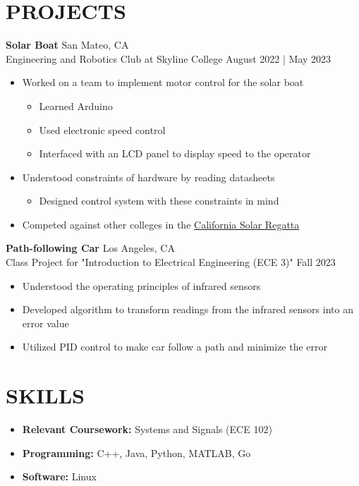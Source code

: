 \documentclass[letterpaper,9pt]{extarticle}
\begin{document}
\section*{PROJECTS}
\noindent
\textbf{Solar Boat} \hfill San Mateo, CA\\ %
Engineering and Robotics Club at Skyline College \hfill August 2022 | May 2023 %
\begin{itemize}
	\item Worked on a team to implement motor control for the solar boat
	\begin{itemize}
		\item Learned Arduino
		\item Used electronic speed control
		\item Interfaced with an LCD panel to display speed to the operator
	\end{itemize}
	\item Understood constraints of hardware by reading datasheets
	\begin{itemize}
		\item Designed control system with these constraints in mind
	\end{itemize}
	\item Competed against other colleges in the \href{https://www.smud.org/en/In-Our-Community/Workshops-and-education-resources/Teachers-and-students/Solar-Regatta}{California Solar Regatta}
\end{itemize}

\noindent
\textbf{Path-following Car} \hfill Los Angeles, CA\\ %
Class Project for "Introduction to Electrical Engineering (ECE 3)" \hfill Fall 2023
\begin{itemize}
	\item Understood the operating principles of infrared sensors
	\item Developed algorithm to transform readings from the infrared sensors into an error value
	\item Utilized PID control to make car follow a path and minimize the error
\end{itemize}

\section*{SKILLS}
\begin{itemize}
	\item \textbf{Relevant Coursework:} Systems and Signals (ECE 102)
	\item \textbf{Programming:} C++, Java, Python, MATLAB, Go
	\item \textbf{Software:} Linux
\end{itemize}

\end{document}
